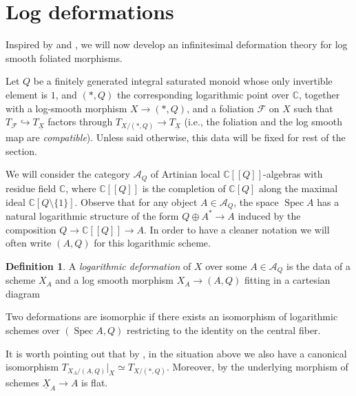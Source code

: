 \documentclass[reqno]{amsart}
\newcommand\C{\mathbb{C}}
\DeclareMathOperator{\Spec}{Spec}
\newcommand{\F}{\mathscr{F}}
\theoremstyle{definition}
\newtheorem{definition}[theorem]{Definition}
\theoremstyle{named}
\begin{document}
\section{Log deformations}
Inspired by \cite{gomez1988transverse} and \cite{kato1996dlog_def}, we will now develop an infinitesimal deformation theory for log smooth foliated morphisms. 

Let $Q$ be a finitely generated integral saturated monoid whose only invertible element is $1$, and $(\ast,Q)$ the corresponding logarithmic point over $\C$, together with a log-smooth morphism $X\to (\ast,Q)$, and a foliation $\F$ on $X$ such that $T_\F\hookrightarrow T_{\underline{X}}$ factors through $T_{X/(\ast,Q)}\to T_{\underline{X}}$ (i.e., the foliation and the log smooth map are \emph{compatible}). Unless said otherwise, this data will be fixed for rest of the section.

We will consider the category $\mathcal A_Q$ of Artinian local $\C[[Q]]$-algebras with residue field $\C$, where $\C[[Q]]$ is the completion of $\C[Q]$ along the maximal ideal $\C[Q\setminus\{1\}]$.
Observe that for any object $A\in \mathcal A_Q$, the space $\Spec A$ has a natural logarithmic structure of the form $Q\oplus A^*\to A$ induced by the composition $Q\to \C[[Q]]\to A$. In order to have a cleaner notation we will often write  $(A,Q)$ for this logarithmic scheme.



\begin{definition}
    A \textit{logarithmic deformation} of $X$ over some $A\in \mathcal A_Q$ is the data of a scheme $X_A$ and a log smooth morphism $X_A\to (A,Q)$ fitting in a cartesian diagram 
    \begin{center}
    \end{center}
    Two deformations are isomorphic if there exists an isomorphism of logarithmic schemes over $(\Spec A,Q)$ restricting to the identity on the central fiber. 
\end{definition}

It is worth pointing out that by \cite[Section 1.7]{kato1988logarithmic_str}, in the situation above we also have a canonical isomorphism $T_{X_A/(A,Q)}\vert_X\simeq T_{X/(\ast,Q)}$. Moreover, by \cite[Corollary 4.5]{kato1988logarithmic_str}
the underlying morphism of schemes $\underline{X}_A\to A$ is flat.
\end{document}
